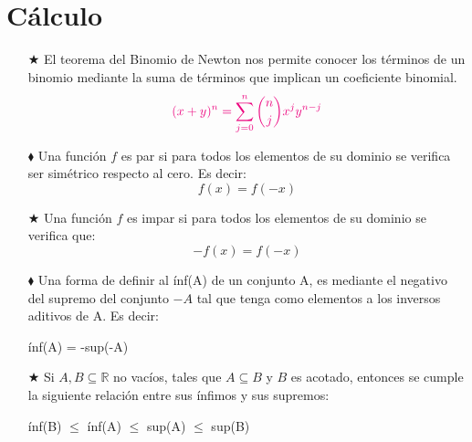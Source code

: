 \documentclass[letterpaper,12pt]{article}
\begin{document}
\section{Cálculo}
\begin{itemize}
    \item [$\bigstar$] El teorema del Binomio de Newton nos permite conocer los términos de un binomio mediante la suma de términos que implican un coeficiente binomial.
    \begin{equation*}
        \textcolor{RubineRed} {(x+y)^n = \sum\limits_{j=0}^{n} \binom{n}{j} x^j y^{n-j} }
    \end{equation*}
    
     \item [$\blacklozenge$] Una función $f$ es par si para todos los elementos de su dominio se verifica ser simétrico respecto al cero. Es decir:
     \begin{equation*}
        f(x) =f(-x)
    \end{equation*}
    
    \item [$\bigstar$] Una función $f$ es impar si para todos los elementos de su dominio se verifica que:
    \begin{equation*}
        -f(x) =f(-x)
    \end{equation*}
    
    \item [$\blacklozenge$] Una forma de definir al ínf(A) de un conjunto A,  es mediante el negativo del supremo del conjunto $-A$ tal que tenga como elementos a los inversos aditivos de A. Es decir:
    \begin{center}
        ínf(A) = -sup(-A)
    \end{center}
    
    
    \item [$\bigstar$] Si $A,B \subseteq \mathbb{R}$ no vacíos, tales que $A\subseteq B$ y $B$ es acotado, entonces se cumple la siguiente relación entre sus ínfimos y sus supremos:
    \begin{center}
        ínf(B) $\leq$ ínf(A) $\leq$  sup(A) $\leq$  sup(B)  
    \end{center}
    
\end{itemize}
   
\end{document}
